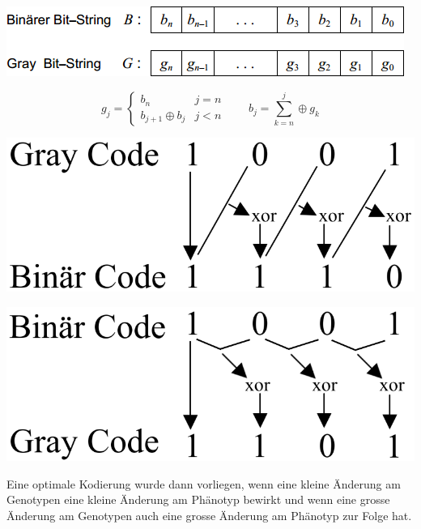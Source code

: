       \begin{minipage}{0.33\textwidth}
      	\begin{center}
  	        \includegraphics[width=\textwidth]{./Content/MetaHeuristics/GeneticAlgorithms_Gray}
  	      \end{center}
  	      $$g_j = \begin{cases}
  	        b_n                & j=n\\
  	        b_{j+1} \oplus b_j & j < n
  	        \end{cases} \qquad 
  	      b_j = \sum \limits_{k=n}^j \oplus g_k$$
      	\end{minipage}
      	\hfill
      	\begin{minipage}{0.3\textwidth}
            \includegraphics[width=\textwidth]{./Content/MetaHeuristics/binGray}	
    	\end{minipage}
    	\hfill
    	\begin{minipage}{0.3\textwidth}
            \includegraphics[width=\textwidth]{./Content/MetaHeuristics/grayBin}    	
    	\end{minipage}
  
  	Eine optimale Kodierung wurde dann vorliegen, wenn eine kleine Änderung am Genotypen eine kleine Änderung am Phänotyp bewirkt und wenn eine grosse Änderung am Genotypen auch eine grosse Änderung am Phänotyp zur Folge hat.

